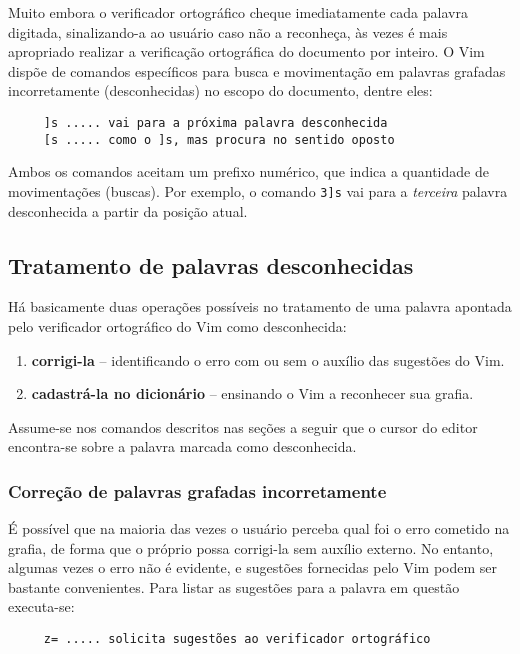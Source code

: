 Muito embora o verificador ortográfico cheque imediatamente cada palavra
digitada, sinalizando-a ao usuário caso não a reconheça, às vezes é mais
apropriado realizar a verificação ortográfica do documento por inteiro.
O Vim dispõe de comandos específicos para busca e movimentação em palavras
grafadas incorretamente (desconhecidas) no escopo do documento, dentre eles:

\begin{verbatim}
     ]s ..... vai para a próxima palavra desconhecida
     [s ..... como o ]s, mas procura no sentido oposto
\end{verbatim}

Ambos os comandos aceitam um prefixo numérico, que indica a quantidade de
movimentações (buscas). Por exemplo, o comando {\tt 3]s} vai para a {\em
terceira} palavra desconhecida a partir da posição atual.

\subsection{Tratamento de palavras desconhecidas}

Há basicamente duas operações possíveis no tratamento de uma palavra apontada
pelo verificador ortográfico do Vim como desconhecida: 

\begin{enumerate}
\item {\bf corrigi-la} -- identificando o erro com ou sem o auxílio das
sugestões do Vim.
\item {\bf cadastrá-la no dicionário} -- ensinando o Vim a reconhecer sua
grafia.
\end{enumerate}

Assume-se nos comandos descritos nas seções a seguir que o cursor do editor
encontra-se sobre a palavra marcada como desconhecida.

\subsubsection{Correção de palavras grafadas incorretamente}

É possível que na maioria das vezes o usuário perceba qual foi o erro cometido
na grafia, de forma que o próprio possa corrigi-la sem auxílio externo. No
entanto, algumas vezes o erro não é evidente, e sugestões fornecidas pelo Vim
podem ser bastante convenientes. Para listar as sugestões para a palavra
em questão executa-se:

\begin{verbatim}
     z= ..... solicita sugestões ao verificador ortográfico
\end{verbatim}

